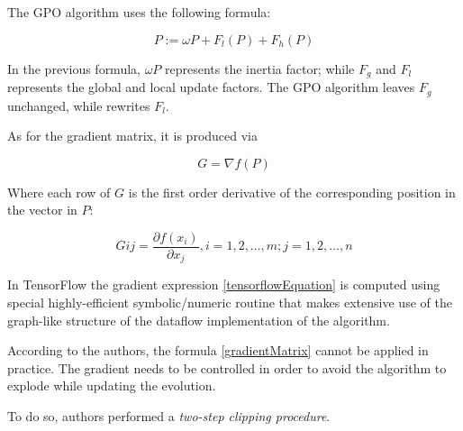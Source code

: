 \documentclass[10pt]{article}
\begin{document}
The GPO algorithm uses the following formula:

\begin{equation}
P := \omega P + F_l(P) + F_h(P)
\end{equation}

In the previous formula, $\omega P$ represents the inertia factor; while $F_g$
and $F_l$ represents the global and local update factors. The GPO algorithm
leaves $F_g$ unchanged, while rewrites $F_l$.

As for the gradient matrix, it is produced via

\begin{equation}
G = \nabla f(P)
\label{gradientMatrix}
\end{equation}

Where each row of $G$ is the first order derivative of the corresponding
position in the vector in $P$:

\begin{equation}
G{ij} = \frac{\partial f (x_i)}{\partial x_j}, 
i = 1, 2, \ldots, m; 
j= 1, 2, \ldots, n
\label{tensorflowEquation}
\end{equation}

In TensorFlow the gradient expression 
\hyperref[tensorflowEquation]{\ref{tensorflowEquation}} is computed using
special highly-efficient symbolic/numeric routine that makes extensive use of
the graph-like structure of the dataflow implementation of the algorithm.

According to the authors, the formula
\hyperref[gradientMatrix]{\ref{gradientMatrix}} cannot be applied in practice.
The gradient needs to be controlled in order to avoid the algorithm to explode
while updating the evolution.

To do so, authors performed a \emph{two-step clipping procedure}.
\end{document}

